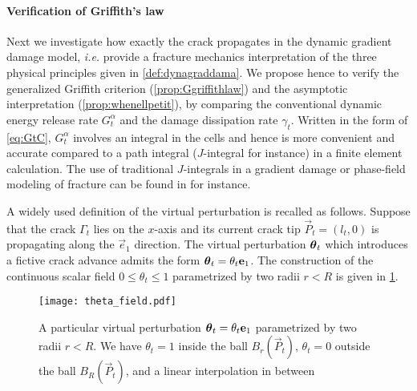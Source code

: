 \paragraph{Verification of Griffith's law} Next we investigate how exactly the crack propagates in the dynamic gradient damage model, \emph{i.e.} provide a fracture mechanics interpretation of the three physical principles given in \cref{def:dynagraddama}. We propose hence to verify the generalized Griffith criterion (\cref{prop:Ggriffithlaw}) and the asymptotic interpretation (\cref{prop:whenellpetit}), by comparing the conventional dynamic energy release rate $G^\alpha_t$ and the damage dissipation rate $\gamma_t$. Written in the form of \eqref{eq:GtC}, $G^\alpha_t$ involves an integral in the cells and hence is more convenient and accurate compared to a path integral ($J$-integral for instance) in a finite element calculation. The use of traditional $J$-integrals in a gradient damage or phase-field modeling of fracture can be found in \cite{HossainHsuehBourdinBhattachary:2014,KlinsmannRosatoKamlahMcMeeking:2015} for instance.

A widely used definition of the virtual perturbation \cite{DestuynderDjaouaLescure:1983} is recalled as follows. Suppose that the crack $\Gamma_t$ lies on the $x$-axis and its current crack tip $\vec{P}_t=(l_t,0)$ is propagating along the $\vec{e}_1$ direction. The virtual perturbation $\vtheta_t$ which introduces a fictive crack advance admits the form $\vtheta_t=\theta_t\vec{e}_1$. The construction of the continuous scalar field $0\leq\theta_t\leq 1$ parametrized by two radii $r<R$ is given in \cref{fig:thetaAnt}.
\begin{figure}[htbp]
\centering
\texttt{[image: theta\_field.pdf]}
\caption{A particular virtual perturbation $\vtheta_t=\theta_t\vec{e}_1$ parametrized by two radii $r<R$. We have $\theta_t=1$ inside the ball $B_r(\vec{P}_t)$, $\theta_t=0$ outside the ball $B_R(\vec{P}_t)$, and a linear interpolation in between} \label{fig:thetaAnt}
\end{figure}

